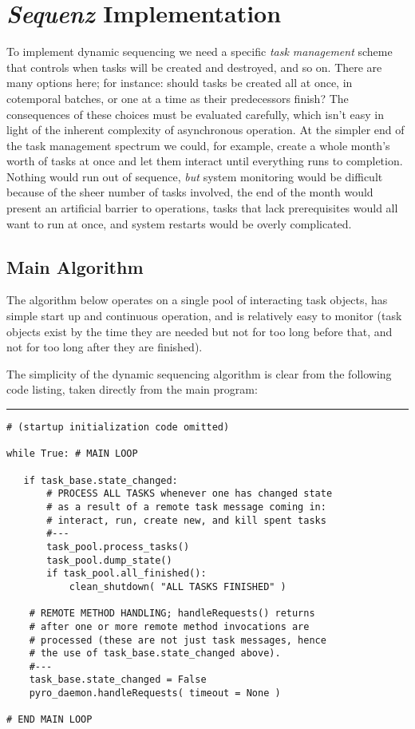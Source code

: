 \documentclass[11pt,a4paper]{article}
\begin{document}
\section{{\em Sequenz} Implementation}

To implement dynamic sequencing we need a specific {\em task management}
scheme that controls when tasks will be created and destroyed, and so
on. There are many options here; for instance: should tasks be created
all at once, in cotemporal batches, or one at a time as their
predecessors finish? The consequences of these choices must be evaluated
carefully, which isn't easy in light of the inherent complexity of
asynchronous operation. At the simpler end of the task management
spectrum we could, for example, create a whole month's worth of tasks at
once and let them interact until everything runs to completion.  Nothing
would run out of sequence, {\em but} system monitoring would be
difficult because of the sheer number of tasks involved, the end of the
month would present an artificial barrier to operations, tasks that lack
prerequisites would all want to run at once, and system restarts would
be overly complicated. 

\subsection{Main Algorithm}

The algorithm below operates on a single pool of interacting task
objects, has simple start up and continuous operation, and is relatively
easy to monitor (task objects exist by the time they are needed but not
for too long before that, and not for too long after they are finished). 

The simplicity of the dynamic sequencing algorithm is clear from the
following code listing, taken directly from the main program:

{\small
\noindent
\rule{5cm}{.2mm}
\begin{lstlisting}
# (startup initialization code omitted)

while True: # MAIN LOOP

   if task_base.state_changed:
       # PROCESS ALL TASKS whenever one has changed state
       # as a result of a remote task message coming in: 
       # interact, run, create new, and kill spent tasks
       #---
       task_pool.process_tasks()
       task_pool.dump_state()
       if task_pool.all_finished():
           clean_shutdown( "ALL TASKS FINISHED" )

    # REMOTE METHOD HANDLING; handleRequests() returns 
    # after one or more remote method invocations are 
    # processed (these are not just task messages, hence 
    # the use of task_base.state_changed above).
    #---
    task_base.state_changed = False
    pyro_daemon.handleRequests( timeout = None )

# END MAIN LOOP
\end{lstlisting}
}
\end{document}
